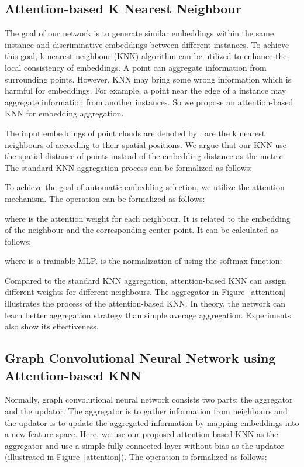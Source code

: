 \documentclass{article}
\begin{document}
\subsection{Attention-based K Nearest Neighbour} \label{Attention_section}
The goal of our network is to generate similar embeddings within the same instance and discriminative embeddings between different instances. To achieve this goal, k nearest neighbour (KNN) algorithm can be utilized to enhance the local consistency of embeddings. A point can aggregate information from surrounding points. However, KNN may bring some wrong information which is harmful for embeddings. For example, a point near the edge of a instance may aggregate information from another instances. So we propose an attention-based KNN for embedding aggregation.

The input embeddings of point clouds are denoted by   .  are the k nearest neighbours of  according to their spatial positions. We argue that our KNN use the spatial distance of points instead of the embedding distance as the metric. The standard KNN aggregation process can be formalized as follows:



To achieve the goal of automatic embedding selection, we utilize the attention mechanism. The operation can be formalized as follows:

where  is the attention weight for each neighbour. It is related to the embedding of the neighbour and the corresponding center point. It can be calculated as follows:

where  is a trainable MLP.  is the normalization of  using the softmax function:


Compared to the standard KNN aggregation, attention-based KNN can assign different weights for different neighbours. The aggregator in Figure~\ref{attention} illustrates the process of the attention-based KNN. In theory, the network can learn better aggregation strategy than simple average aggregation. Experiments also show its effectiveness.

\subsection{Graph Convolutional Neural Network using Attention-based KNN} \label{Graph_section}
Normally, graph convolutional neural network consists two parts: the aggregator and the updator. The aggregator is to gather information from neighbours and the updator is to update the aggregated information by mapping embeddings into a new feature space. Here, we use our proposed attention-based KNN as the aggregator and use a simple fully connected layer without bias as the updator (illustrated in Figure~\ref{attention}). The operation is formalized as follows:
\end{document}
